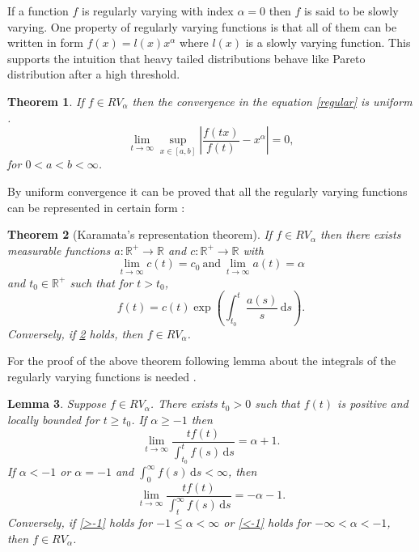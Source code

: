 \documentclass[english,12pt,a4paper,pdftex,sci,utf8]{aaltothesis} %
\newtheorem{theorem}{Theorem}[section]
\newtheorem{lemma}[theorem]{Lemma}
\begin{document}
If a function $f$  is regularly varying with index $\alpha=0$ then $f$ is said to be slowly varying. One property of regularly varying functions is that all of them can be written in form $f(x)=l(x)x^{\alpha}$ where $l(x)$ is a slowly varying function. This supports the intuition that heavy tailed distributions behave like Pareto distribution after a high threshold. 



\begin{theorem}
If $f \in RV_{\alpha}$ then the convergence in the equation \eqref{regular} is uniform .
\begin{equation*}
\lim_{t \rightarrow \infty} \sup_{x  \in [a,b]} \left| \frac{f(tx)}{f(t)} - x^{\alpha} \right| = 0,
\end{equation*}
for $0<a<b<\infty$.
\label{uniform}
\end{theorem}



By uniform convergence it can be proved that all the regularly varying functions can be represented in certain form \cite{deHaan}:

\begin{theorem}[Karamata's representation theorem]
If $f \in RV_{\alpha}$ then there exists measurable functions $a: \mathbb{R^+} \rightarrow \mathbb{R}$ and $c: \mathbb{R^+} \rightarrow \mathbb{R}$ with
\begin{equation*}
\lim_{t \rightarrow \infty} c(t) = c_0 \  \text{and} \  \lim_{t \rightarrow \infty} a(t) = \alpha
\end{equation*}
and $t_0 \in \mathbb{R^+}$ such that for $t > t_0$,
\begin{equation}
f(t) = c(t) \exp \left(\int_{t_0}^{t}  \frac{a(s)}{s} \, \mathrm{d}s \right).
\end{equation}
Conversely, if \ref{karamata} holds, then $f \in RV_{\alpha}$.
\label{karamata}
\end{theorem}

For the proof of the above theorem following lemma about the integrals of the regularly varying functions is needed \cite{deHaan}.

\begin{lemma}
Suppose $f \in RV_{\alpha}$. There exists $t_0 > 0$ such that $f(t)$ is positive and locally bounded for $t \geq t_0$. If $\alpha \geq -1$ then
\begin{equation}
\lim_{t \rightarrow \infty} \frac{tf(t)}{\int_{t_0}^{t}f(s) \, \mathrm{d}s} = \alpha + 1.
\label{>-1}
\end{equation}
If $\alpha<-1$ or $\alpha= -1$ and $\int_{0}^{\infty}f(s) \, \mathrm{d}s<\infty$, then
\begin{equation}
\lim_{t \rightarrow \infty} \frac{tf(t)}{\int_{t}^{\infty} f(s) \, \mathrm{d}s} = -\alpha - 1.
\label{<-1}
\end{equation}
Conversely, if \eqref{>-1} holds for $-1\leq \alpha < \infty$ or \eqref{<-1} holds for $-\infty<\alpha<-1$, then $f \in RV_{\alpha}$.
\label{karamlemma}
\end{lemma}
\end{document}
